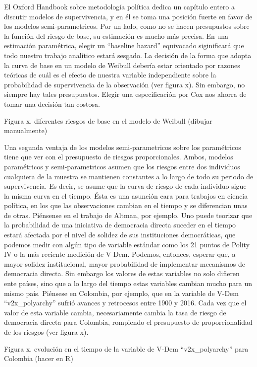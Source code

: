 \documentclass[]{book}
\begin{document}
El Oxford Handbook sobre metodología política dedica un capítulo entero
a discutir modelos de supervivencia, y en él se toma una posición fuerte
en favor de los modelos semi-parametricos. Por un lado, como no se hacen
presupustos sobre la función del riesgo de base, su estimación es mucho
más precisa. En una estimación paramétrica, elegir un ``baseline
hazard'' equivocado siginificará que todo nuestro trabajo analítico
estará sesgado. La decisión de la forma que adopta la curva de base en
un modelo de Weibull debería estar orientado por razones teóricas de
cuál es el efecto de nuestra variable independiente sobre la
probabilidad de supervivencia de la observación (ver figura x). Sin
embargo, no siempre hay tales presupuestos. Elegir una especificación
por Cox nos ahorra de tomar una decisión tan costosa.

Figura x. diferentes riesgos de base en el modelo de Weibull (dibujar
manualmente)

Una segunda ventaja de los modelos semi-parametricos sobre los
paramétricos tiene que ver con el presupuesto de riesgos proporcionales.
Ambos, modelos paramétricos y semi-parametricos asumen que los riesgos
entre dos individuos cualquiera de la muestra se mantienen constantes a
lo largo de todo su periodo de supervivencia. Es decir, se asume que la
curva de riesgo de cada individuo sigue la misma curva en el tiempo.
Ésta es una asunción cara para trabajos en ciencia política, en los que
las observaciones cambian en el tiempo y se diferencian unas de otras.
Piénsense en el trabajo de Altman, por ejemplo. Uno puede teorizar que
la probabilidad de una iniciativa de democracia directa suceder en el
tiempo estará afectada por el nivel de solidez de sus instituciones
democráticas, que podemos medir con algún tipo de variable estándar como
los 21 puntos de Polity IV o la más reciente medición de V-Dem. Podemos,
entonces, esperar que, a mayor solidez institucional, mayor probabilidad
de implementar mecanismos de democracia directa. Sin embargo los valores
de estas variables no solo difieren ente países, sino que a lo largo del
tiempo estas variables cambian mucho para un mismo país. Piénsese en
Colombia, por ejemplo, que en la variable de V-Dem ``v2x\_polyarchy''
sufrió avances y retrocesos entre 1900 y 2016. Cada vez que el valor de
esta variable cambia, necesariamente cambia la tasa de riesgo de
democracia directa para Colombia, rompiendo el presupuesto de
proporcionalidad de los riesgos (ver figura x).

Figura x. evolución en el tiempo de la variable de V-Dem
``v2x\_polyarchy'' para Colombia (hacer en R)
\end{document}
